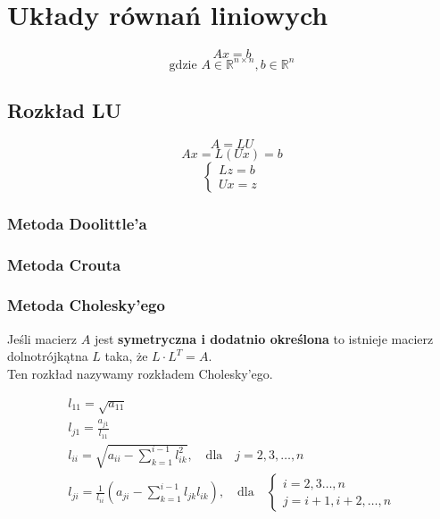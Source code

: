 \documentclass[../mn-notatki.tex]{subfiles}
\begin{document}
\section{Układy równań liniowych}

\begin{tcolorbox}
\[
Ax = b
\]
\[
\text{gdzie } A \in \mathbb{R}^{n \times n}, b \in \mathbb{R}^n
\]
\end{tcolorbox}

\subsection{Rozkład LU}

\begin{tcolorbox}
\[
A = LU
\]
\[
Ax = L(Ux) = b
\]
\[
\begin{cases}
Lz = b\\
Ux = z
\end{cases}
\]
\end{tcolorbox}

\subsubsection{Metoda Doolittle'a}
\subsubsection{Metoda Crouta}
\subsubsection{Metoda Cholesky'ego}

\begin{tcolorbox}
Jeśli macierz $A$ jest \textbf{symetryczna i dodatnio określona} to istnieje
macierz dolnotrójkątna $L$ taka, że $L\cdot L^T = A$.\\
Ten rozkład nazywamy rozkładem Cholesky'ego.
\end{tcolorbox}
\begin{gather*}
l_{11} = \sqrt{a_{11}}\\
l_{j1} = \frac{a_{j1}}{l_{11}}\\
l_{ii} = \sqrt{a_{ii} - \sum_{k=1}^{i-1} l_{ik}^2}, \text{~~ dla ~~} j = 2, 3, \ldots, n\\
l_{ji} = \frac{1}{l_{ii}} \left( a_{ji} - \sum_{k=1}^{i-1} l_{jk} l_{ik} \right),
\text{~~ dla ~~}
\begin{cases}
i = 2,3 \ldots, n\\
j = i +1, i+2, \ldots, n
\end{cases}
\end{gather*}
\end{document}
